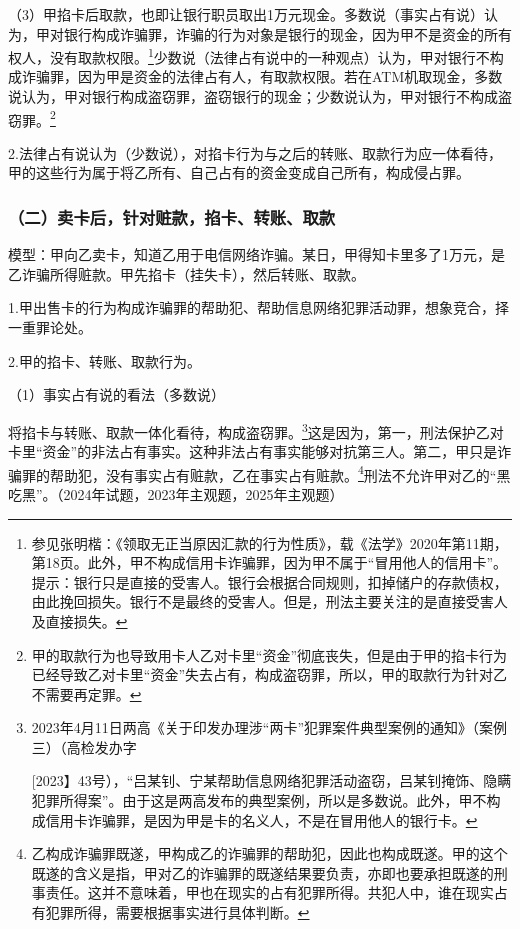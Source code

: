 （3）甲掐卡后取款，也即让银行职员取出1万元现金。多数说（事实占有说）认为，甲对银行构成诈骗罪，诈骗的行为对象是银行的现金，因为甲不是资金的所有权人，没有取款权限。\footnote{参见张明楷：《领取无正当原因汇款的行为性质》，载《法学》2020年第11期，第18页。此外，甲不构成信用卡诈骗罪，因为甲不属于“冒用他人的信用卡”。提示：银行只是直接的受害人。银行会根据合同规则，扣掉储户的存款债权，由此挽回损失。银行不是最终的受害人。但是，刑法主要关注的是直接受害人及直接损失。}少数说（法律占有说中的一种观点）认为，甲对银行不构成诈骗罪，因为甲是资金的法律占有人，有取款权限。若在ATM机取现金，多数说认为，甲对银行构成盗窃罪，盗窃银行的现金；少数说认为，甲对银行不构成盗窃罪。\footnote{甲的取款行为也导致用卡人乙对卡里“资金”彻底丧失，但是由于甲的掐卡行为已经导致乙对卡里“资金”失去占有，构成盗窃罪，所以，甲的取款行为针对乙不需要再定罪。}

2.法律占有说认为（少数说），对掐卡行为与之后的转账、取款行为应一体看待，甲的这些行为属于将乙所有、自己占有的资金变成自己所有，构成侵占罪。

\subsubsection*{（二）卖卡后，针对赃款，掐卡、转账、取款}

模型：甲向乙卖卡，知道乙用于电信网络诈骗。某日，甲得知卡里多了1万元，是乙诈骗所得赃款。甲先掐卡（挂失卡），然后转账、取款。

1.甲出售卡的行为构成诈骗罪的帮助犯、帮助信息网络犯罪活动罪，想象竞合，择一重罪论处。

2.甲的掐卡、转账、取款行为。

（1）事实占有说的看法（多数说）

将掐卡与转账、取款一体化看待，构成盗窃罪。\footnote{2023年4月11日两高《关于印发办理涉“两卡”犯罪案件典型案例的通知》（案例三）（高检发办字

[2023】43号），“吕某钊、宁某帮助信息网络犯罪活动盗窃，吕某钊掩饰、隐瞒犯罪所得案”。由于这是两高发布的典型案例，所以是多数说。此外，甲不构成信用卡诈骗罪，是因为甲是卡的名义人，不是在冒用他人的银行卡。}这是因为，第一，刑法保护乙对卡里“资金”的非法占有事实。这种非法占有事实能够对抗第三人。第二，甲只是诈骗罪的帮助犯，没有事实占有赃款，乙在事实占有赃款。\footnote{乙构成诈骗罪既遂，甲构成乙的诈骗罪的帮助犯，因此也构成既遂。甲的这个既遂的含义是指，甲对乙的诈骗罪的既遂结果要负责，亦即也要承担既遂的刑事责任。这并不意味着，甲也在现实的占有犯罪所得。共犯人中，谁在现实占有犯罪所得，需要根据事实进行具体判断。}刑法不允许甲对乙的“黑吃黑”。（2024年试题，2023年主观题，2025年主观题）

